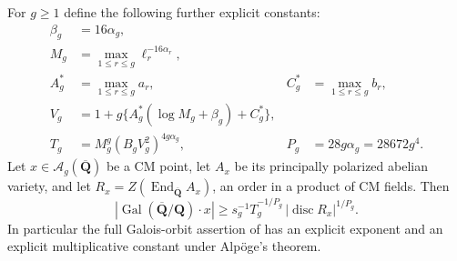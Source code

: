 \begin{theorem}
\label{NC04}
For $g\geq1$ define the following further explicit constants:
\begin{align*}
 \beta_g&=16\alpha_g,\\
 M_g&=\max_{1\leq r\leq g}\ell_r^{-16\alpha_r},\\
 A_g^*&=\max_{1\leq r\leq g}a_r,
 &C_g^*&=\max_{1\leq r\leq g}b_r,\\
 V_g&=1+g\{A_g^*(\log M_g+\beta_g)+C_g^*\},\\
 T_g&=M_g^g(B_gV_g^2)^{4g\alpha_g},
 &P_g&=28g\alpha_g=28672g^4.
\end{align*}
Let $x\in\mathcal A_g(\overline{\mathbf Q})$ be a CM point, let
$A_x$ be its principally polarized abelian variety, and let
$R_x=Z(\operatorname{End}_{\overline{\mathbf Q}}A_x)$, an order in a
product of CM fields.  Then
\begin{equation}\label{eq:NC04-orbit}
 |\operatorname{Gal}(\overline{\mathbf Q}/\mathbf Q)\cdot x|
 \geq s_g^{-1}T_g^{-1/P_g}\,|\operatorname{disc}R_x|^{1/P_g}.
\end{equation}
In particular the full Galois-orbit assertion of
\cite[Theorem~5.2, p.~385]{NC-Tsimerman2018} has an explicit exponent
and an explicit multiplicative constant under Alp\"oge's theorem.
\end{theorem}

